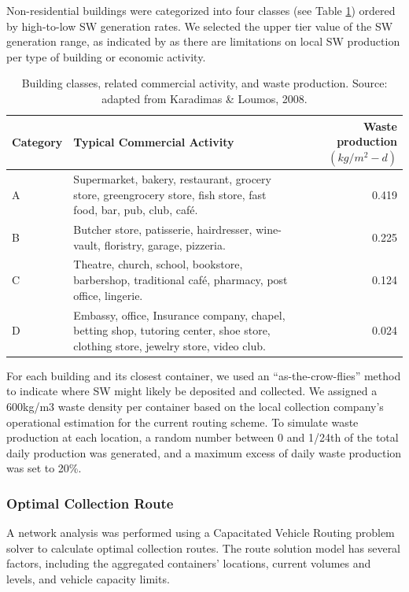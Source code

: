 \documentclass[authoryear,preprint,review,doubleblind, 12pt]{elsarticle}
\begin{document}
    Non-residential buildings were categorized into four classes (see Table \ref{tab:waste1}) ordered by high-to-low SW generation rates. We selected the upper tier value of the SW generation range, as indicated by \citet{Karadimas2008} as there are limitations on local SW production per type of building or economic activity.

    \begin{table}[h!]
        \centering
        \caption{Building classes, related commercial activity, and waste production. Source: adapted from Karadimas \& Loumos, 2008.}
        \footnotesize
        \label{tab:waste1}
        \begin{tabularx}{\linewidth}{l X r}
            \toprule
            Category&Typical Commercial Activity&\shortstack{Waste production \\
            $(kg/m^2 - d)$}\\
            \midrule
            A& Supermarket, bakery, restaurant, grocery store, greengrocery store, fish store, fast food, bar, pub, club, café.&0.419\\
            B& Butcher store, patisserie, hairdresser, wine-vault, floristry, garage, pizzeria.&0.225\\
            C& Theatre, church, school, bookstore, barbershop, traditional café, pharmacy, post office, lingerie.&0.124\\
            D& Embassy, office, Insurance company, chapel, betting shop, tutoring center, shoe store, clothing store, jewelry store, video club.&0.024\\
            \bottomrule        
        \end{tabularx}
    \end{table}

    For each building and its closest container, we used an “as-the-crow-flies” method to indicate where SW might likely be deposited and collected. We assigned a 600kg/m3 waste density per container based on the local collection company's operational estimation for the current routing scheme. To simulate waste production at each location, a random number between 0 and 1/24th of the total daily production was generated, and a maximum excess of daily waste production was set to 20\%.

    \subsubsection{Optimal Collection Route} \label{subsec:OptimalR}
    A network analysis was performed using a Capacitated Vehicle Routing problem solver \citep{ESRI2023c} to calculate optimal collection routes. The route solution model has several factors, including the aggregated containers’ locations, current volumes and levels, and vehicle capacity limits.
\end{document}
